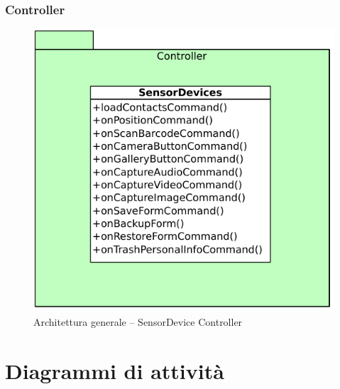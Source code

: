 \subsubsection{Controller}
\begin{figure}[htb]
\centering
\includegraphics[scale=0.6]{gfx/class/SensorDevice_Controller.pdf}
\caption{Architettura generale -- SensorDevice Controller}
\label{fig:architettura SensorDevice Controller}
\end{figure}

\section{Diagrammi di attività}